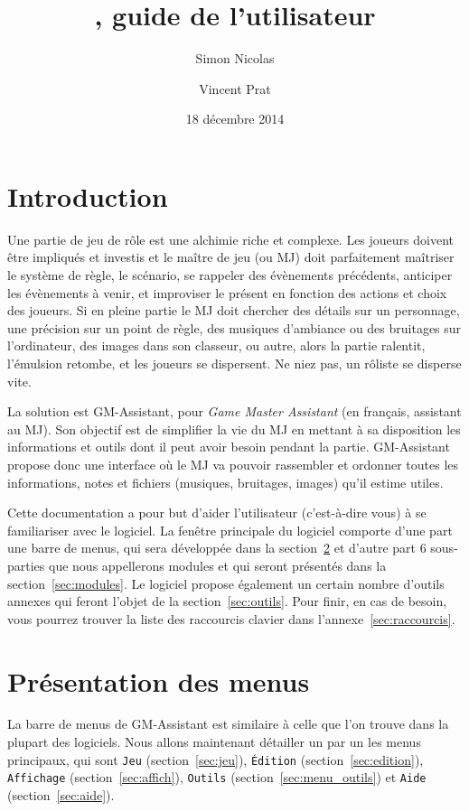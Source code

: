 \documentclass[a4paper,12pt]{article}
\title{\GMA \versionnumber, guide de l'utilisateur}
\author{Simon Nicolas \and Vincent Prat}
\date{18 décembre 2014}
\newcommand*{\GMA}{GM-Assistant\xspace}
\newcommand*{\interfaceitem}[1]{\texttt{#1}}
\begin{document}
\maketitle

\tableofcontents

\section{Introduction}

Une partie de jeu de rôle est une alchimie riche et complexe.
Les joueurs doivent être impliqués et investis et le maître de jeu (ou MJ) doit parfaitement maîtriser le système de règle, le scénario, se rappeler des évènements précédents, anticiper les évènements à venir, et improviser le présent en fonction des actions et choix des joueurs.
Si en pleine partie le MJ doit chercher des détails sur un personnage, une précision sur un point de règle, des musiques d'ambiance ou des bruitages sur l'ordinateur, des images dans son classeur, ou autre, alors la partie ralentit, l'émulsion retombe, et les joueurs se dispersent.
Ne niez pas, un rôliste se disperse vite.

La solution est \GMA, pour \emph{Game Master Assistant} (en français, assistant au MJ).
Son objectif est de simplifier la vie du MJ en mettant à sa disposition les informations et outils dont il peut avoir besoin pendant la partie.
\GMA propose donc une interface où le MJ va pouvoir rassembler et ordonner toutes les informations, notes et fichiers (musiques, bruitages, images) qu'il estime utiles.

Cette documentation a pour but d'aider l'utilisateur (c'est-à-dire vous) à se familiariser avec le logiciel.
La fenêtre principale du logiciel comporte d'une part une barre de menus, qui sera développée dans la section~\ref{menu} et d'autre part 6 sous-parties que nous appellerons modules et qui seront présentés dans la section~\ref{sec:modules}.
Le logiciel propose également un certain nombre d'outils annexes qui feront l'objet de la section~\ref{sec:outils}.
Pour finir, en cas de besoin, vous pourrez trouver la liste des raccourcis clavier dans l'annexe~\ref{sec:raccourcis}. 

\section{Présentation des menus}
\label{menu}

La barre de menus de \GMA est similaire à celle que l'on trouve dans la plupart des logiciels.
Nous allons maintenant détailler un par un les menus principaux, qui sont \interfaceitem{Jeu} (section~\ref{sec:jeu}), \interfaceitem{Édition} (section~\ref{sec:edition}), \interfaceitem{Affichage} (section~\ref{sec:affich}), \interfaceitem{Outils} (section~\ref{sec:menu_outils}) et \interfaceitem{Aide} (section~\ref{sec:aide}).
\end{document}
